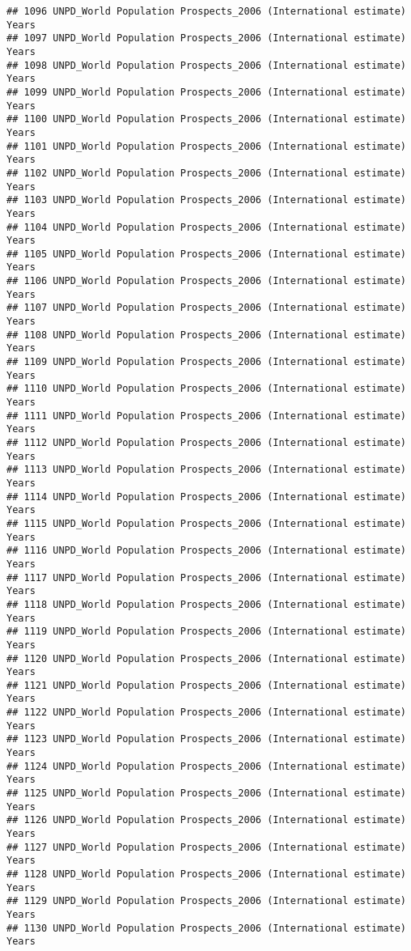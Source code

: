 \documentclass[]{article}
\begin{document}
\begin{verbatim}
## 1096 UNPD_World Population Prospects_2006 (International estimate) Years
## 1097 UNPD_World Population Prospects_2006 (International estimate) Years
## 1098 UNPD_World Population Prospects_2006 (International estimate) Years
## 1099 UNPD_World Population Prospects_2006 (International estimate) Years
## 1100 UNPD_World Population Prospects_2006 (International estimate) Years
## 1101 UNPD_World Population Prospects_2006 (International estimate) Years
## 1102 UNPD_World Population Prospects_2006 (International estimate) Years
## 1103 UNPD_World Population Prospects_2006 (International estimate) Years
## 1104 UNPD_World Population Prospects_2006 (International estimate) Years
## 1105 UNPD_World Population Prospects_2006 (International estimate) Years
## 1106 UNPD_World Population Prospects_2006 (International estimate) Years
## 1107 UNPD_World Population Prospects_2006 (International estimate) Years
## 1108 UNPD_World Population Prospects_2006 (International estimate) Years
## 1109 UNPD_World Population Prospects_2006 (International estimate) Years
## 1110 UNPD_World Population Prospects_2006 (International estimate) Years
## 1111 UNPD_World Population Prospects_2006 (International estimate) Years
## 1112 UNPD_World Population Prospects_2006 (International estimate) Years
## 1113 UNPD_World Population Prospects_2006 (International estimate) Years
## 1114 UNPD_World Population Prospects_2006 (International estimate) Years
## 1115 UNPD_World Population Prospects_2006 (International estimate) Years
## 1116 UNPD_World Population Prospects_2006 (International estimate) Years
## 1117 UNPD_World Population Prospects_2006 (International estimate) Years
## 1118 UNPD_World Population Prospects_2006 (International estimate) Years
## 1119 UNPD_World Population Prospects_2006 (International estimate) Years
## 1120 UNPD_World Population Prospects_2006 (International estimate) Years
## 1121 UNPD_World Population Prospects_2006 (International estimate) Years
## 1122 UNPD_World Population Prospects_2006 (International estimate) Years
## 1123 UNPD_World Population Prospects_2006 (International estimate) Years
## 1124 UNPD_World Population Prospects_2006 (International estimate) Years
## 1125 UNPD_World Population Prospects_2006 (International estimate) Years
## 1126 UNPD_World Population Prospects_2006 (International estimate) Years
## 1127 UNPD_World Population Prospects_2006 (International estimate) Years
## 1128 UNPD_World Population Prospects_2006 (International estimate) Years
## 1129 UNPD_World Population Prospects_2006 (International estimate) Years
## 1130 UNPD_World Population Prospects_2006 (International estimate) Years

\end{verbatim}
\end{document}
